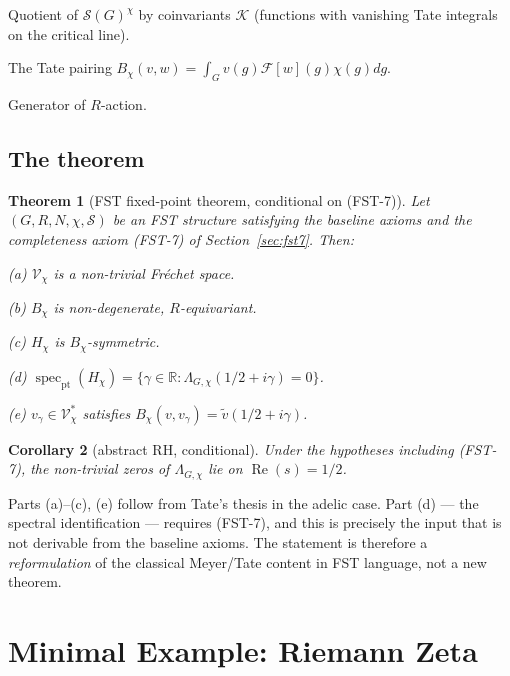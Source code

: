 \documentclass[11pt,a4paper]{article}
\theoremstyle{plain}
\newtheorem{theorem}{Theorem}[section]
\newtheorem{corollary}[theorem]{Corollary}
\theoremstyle{definition}
\DeclareMathOperator{\spec}{spec}
\newcommand{\R}{\mathbb{R}}
\newcommand{\V}{\mathcal{V}}
\renewcommand{\S}{\mathcal{S}}
\newcommand{\K}{\mathcal{K}}
\newcommand{\chifn}{\chi}
\renewcommand{\Re}{\operatorname{Re}}
\begin{document}
\begin{description}[style=nextline]
\item[$\V_\chifn$] Quotient of $\S(G)^\chifn$ by coinvariants $\K$
  (functions with vanishing Tate integrals on the critical line).
\item[$B_\chifn$] The Tate pairing $B_\chifn(v, w) = \int_G v(g)
  \mathcal F[w](g) \chifn(g) dg$.
\item[$H_\chifn$] Generator of $R$-action.
\end{description}

\subsection{The theorem}

\begin{theorem}[FST fixed-point theorem, conditional on (FST-7)]
\label{thm:fst-fixed-point}
Let $(G, R, N, \chifn, \S)$ be an FST structure satisfying the
baseline axioms and the completeness axiom (FST-7) of
Section~\ref{sec:fst7}.  Then:

\noindent(a) $\V_\chifn$ is a non-trivial Fr\'echet space.

\noindent(b) $B_\chifn$ is non-degenerate, $R$-equivariant.

\noindent(c) $H_\chifn$ is $B_\chifn$-symmetric.

\noindent(d) $\spec_\mathrm{pt}(H_\chifn) = \{\gamma \in \R :
  \Lambda_{G,\chifn}(1/2 + i\gamma) = 0\}$.

\noindent(e) $v_\gamma \in \V_\chifn^\ast$ satisfies
  $B_\chifn(v, v_\gamma) = \tilde v(1/2 + i\gamma)$.
\end{theorem}

\begin{corollary}[abstract RH, conditional]
\label{cor:abstract-rh}
Under the hypotheses \emph{including (FST-7)}, the non-trivial zeros
of $\Lambda_{G,\chifn}$ lie on $\Re(s) = 1/2$.
\end{corollary}

Parts (a)--(c), (e) follow from Tate's thesis in the adelic case.
Part (d) --- the spectral identification --- requires (FST-7), and
this is precisely the input that is not derivable from the baseline
axioms.  The statement is therefore a \emph{reformulation} of the
classical Meyer/Tate content in FST language, not a new theorem.

\section{Minimal Example: Riemann Zeta}
\label{sec:minimal-example}
\end{document}
